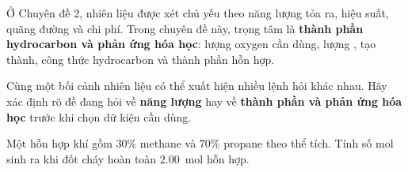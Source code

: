 Ở Chuyên đề 2, nhiên liệu được xét chủ yếu theo năng lượng tỏa ra, hiệu suất, quãng đường và chi phí. Trong chuyên đề này, trọng tâm là \textbf{thành phần hydrocarbon và phản ứng hóa học}: lượng oxygen cần dùng, lượng ,  tạo thành, công thức hydrocarbon và thành phần hỗn hợp.

\begin{notechem}
Cùng một bối cảnh nhiên liệu có thể xuất hiện nhiều lệnh hỏi khác nhau. Hãy xác định rõ đề đang hỏi về \textbf{năng lượng} hay về \textbf{thành phần và phản ứng hóa học} trước khi chọn dữ kiện cần dùng.
\end{notechem}

\begin{tuluyen}
Một hỗn hợp khí gồm $30\%$ methane và $70\%$ propane theo thể tích. Tính số mol  sinh ra khi đốt cháy hoàn toàn \SI{2.00}{\mole} hỗn hợp.
\end{tuluyen}

